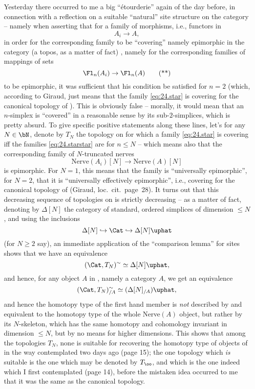 \bigbreak
\presectionfill{}\par

%
\label{sec:24}%
Yesterday there occurred to me a big ``\'etourderie'' again of the day
before, in connection with a reflection on a suitable ``natural'' site
structure on the category \Cat{} -- namely when asserting that for a
family of morphisms, i.e., functors in \Cat{}
\begin{equation}
  \label{eq:24.star}
  A_i \to A, \tag{*}
\end{equation}
in order for the corresponding family to be ``covering'' namely
epimorphic in the category (a topos, as a matter of fact) \Sssets,
namely for the corresponding families of mappings of sets
\begin{equation}
  \label{eq:24.starstar}
  \Fl_n(A_i) \to \Fl_n(A) \tag{**}
\end{equation}
to be epimorphic, it was sufficient that his condition be satisfied
for $n=2$ (which, according to Giraud, just means that the family
\eqref{eq:24.star} is covering for the canonical topology of
\Cat{}). This is obviously false -- morally, it would mean that an
$n$-simplex is ``covered'' in a reasonable sense by its
sub-$2$-simplices, which is pretty absurd. To give
specific positive statements along these lines, let's for any
$N\in\bN$, denote by $T_N$ the topology on \Cat{} for which a family
\eqref{eq:24.star} is covering if{f} the families
\eqref{eq:24.starstar} are for $n\le N$ -- which means also that the
corresponding family of $N$-truncated nerves
\[ \text{Nerve}(A_i)[N] \to \text{Nerve}(A)[N] \]
is epimorphic. For $N=1$, this means that the family is ``universally
epimorphic'', for $N=2$, that it is ``universally effectively
epimorphic'', i.e., covering for the canonical topology of \Cat{}
(Giraud, loc.\ cit.\ page~28). It turns out that this decreasing
sequence of topologies on \Cat{} is strictly decreasing -- as a matter
of fact, denoting by $\Delta[N]$ the category of standard, ordered
simplices of dimension $\le N$, and using the inclusions
\[ \Delta[N] \hookrightarrow \Cat \hookrightarrow
\Delta[N]\uphat \]
(for $N\ge 2$ say), an immediate application of the ``comparison
lemma'' for sites shows that we have an equivalence
\[ (\Cat, T_N)^\sim \simeq {\Delta[N]}\uphat,\]
and hence, for any object $A$ in \Cat{}, namely a category $A$, we get
an equivalence
\[ (\Cat, T_N)_{/A}^\sim \simeq (\Delta[N]_{/A})\uphat,\]
and hence the homotopy type of the first hand member is \emph{not}
described by and equivalent to the homotopy type of the whole
Nerve$(A)$ object, but rather by its $N$-skeleton, which has the same
homotopy and cohomology invariant in dimension $\le N$, but by no
means for higher dimensions. This shows that among the topologies
$T_N$, none is suitable for recovering the homotopy type of objects of
\Cat{} in the way contemplated two days ago (page 15); the one topology
which \emph{is} suitable is the one which may be denoted by $T_\oo$,
and which is the one indeed which I first contemplated (page 14),
before the mistaken idea occurred to me that it was the same as the
canonical topology.


